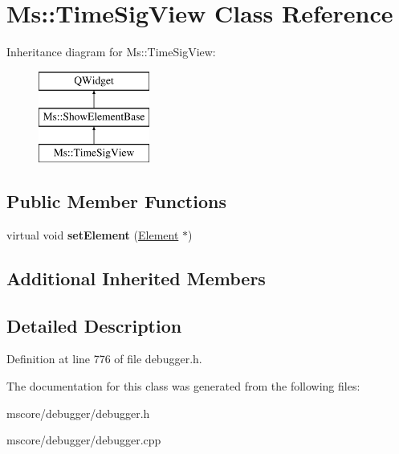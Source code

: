 \hypertarget{class_ms_1_1_time_sig_view}{}\section{Ms\+:\+:Time\+Sig\+View Class Reference}
\label{class_ms_1_1_time_sig_view}
Inheritance diagram for Ms\+:\+:Time\+Sig\+View\+:\begin{figure}[H]
\begin{center}
\leavevmode
\includegraphics[height=3.000000cm]{class_ms_1_1_time_sig_view}
\end{center}
\end{figure}
\subsection*{Public Member Functions}
\begin{DoxyCompactItemize}
\item 
\mbox{\label{class_ms_1_1_time_sig_view_ac429d41033febf040f041cb018cbb04a}} 
virtual void {\bfseries set\+Element} (\hyperlink{class_ms_1_1_element}{Element} $\ast$)
\end{DoxyCompactItemize}
\subsection*{Additional Inherited Members}


\subsection{Detailed Description}


Definition at line 776 of file debugger.\+h.



The documentation for this class was generated from the following files\+:\begin{DoxyCompactItemize}
\item 
mscore/debugger/debugger.\+h\item 
mscore/debugger/debugger.\+cpp\end{DoxyCompactItemize}
